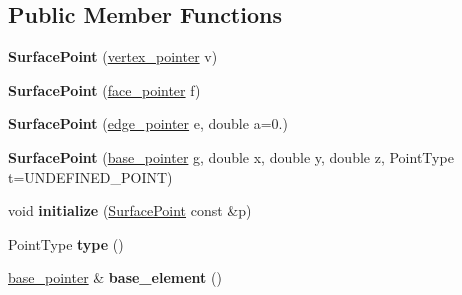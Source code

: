 \subsection*{Public Member Functions}
\begin{DoxyCompactItemize}
\item 
\hypertarget{classgeodesic_1_1_surface_point_a0b3e51673280e8cd35b31852ea133353}{}{\bfseries Surface\+Point} (\hyperlink{classgeodesic_1_1_vertex}{vertex\+\_\+pointer} v)\label{classgeodesic_1_1_surface_point_a0b3e51673280e8cd35b31852ea133353}

\item 
\hypertarget{classgeodesic_1_1_surface_point_a852547bbcc044c3a298281e7fc54c3af}{}{\bfseries Surface\+Point} (\hyperlink{classgeodesic_1_1_face}{face\+\_\+pointer} f)\label{classgeodesic_1_1_surface_point_a852547bbcc044c3a298281e7fc54c3af}

\item 
\hypertarget{classgeodesic_1_1_surface_point_a98520131e510eb03485e14a68591327d}{}{\bfseries Surface\+Point} (\hyperlink{classgeodesic_1_1_edge}{edge\+\_\+pointer} e, double a=0.)\label{classgeodesic_1_1_surface_point_a98520131e510eb03485e14a68591327d}

\item 
\hypertarget{classgeodesic_1_1_surface_point_a89a4631c0553510d0432883b6e8db890}{}{\bfseries Surface\+Point} (\hyperlink{classgeodesic_1_1_mesh_element_base}{base\+\_\+pointer} g, double x, double y, double z, Point\+Type t=U\+N\+D\+E\+F\+I\+N\+E\+D\+\_\+\+P\+O\+I\+N\+T)\label{classgeodesic_1_1_surface_point_a89a4631c0553510d0432883b6e8db890}

\item 
\hypertarget{classgeodesic_1_1_surface_point_adfc8c5751a21a8c7827747f1f7acead0}{}void {\bfseries initialize} (\hyperlink{classgeodesic_1_1_surface_point}{Surface\+Point} const \&p)\label{classgeodesic_1_1_surface_point_adfc8c5751a21a8c7827747f1f7acead0}

\item 
\hypertarget{classgeodesic_1_1_surface_point_a95482fed3f71d540e60991f2d78a7e11}{}Point\+Type {\bfseries type} ()\label{classgeodesic_1_1_surface_point_a95482fed3f71d540e60991f2d78a7e11}

\item 
\hypertarget{classgeodesic_1_1_surface_point_a475fe35c89f819af681b7370765b4c06}{}\hyperlink{classgeodesic_1_1_mesh_element_base}{base\+\_\+pointer} \& {\bfseries base\+\_\+element} ()\label{classgeodesic_1_1_surface_point_a475fe35c89f819af681b7370765b4c06}

\end{DoxyCompactItemize}
